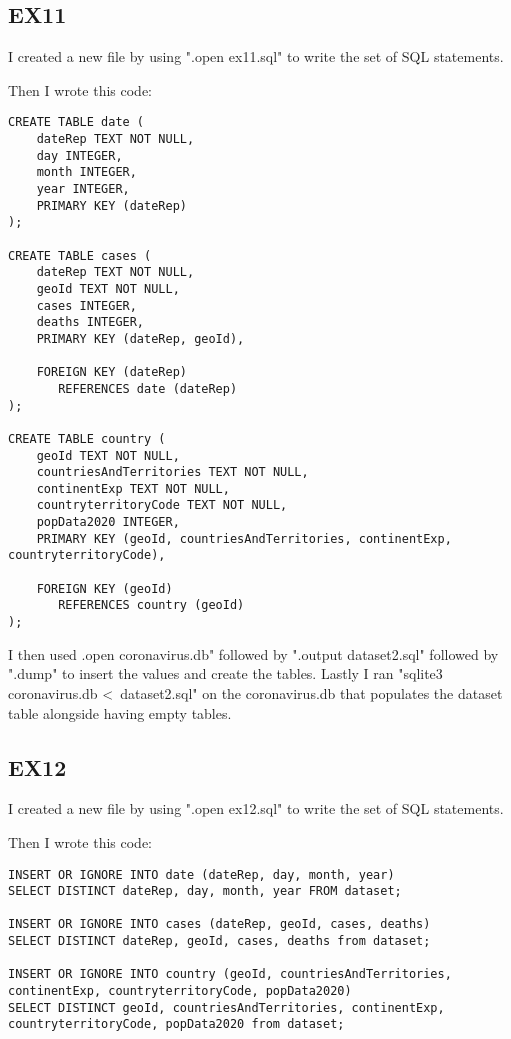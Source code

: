 \documentclass{article}
\begin{document}
\subsection{EX11}

I created a new file by using ".open ex11.sql" to write the set of SQL statements.

Then I wrote this code:

\begin{verbatim}
CREATE TABLE date (
    dateRep TEXT NOT NULL,
    day INTEGER,
    month INTEGER,
    year INTEGER,
    PRIMARY KEY (dateRep)
);

CREATE TABLE cases (
    dateRep TEXT NOT NULL,
    geoId TEXT NOT NULL,
    cases INTEGER,
    deaths INTEGER,
    PRIMARY KEY (dateRep, geoId),

    FOREIGN KEY (dateRep)
       REFERENCES date (dateRep)
);

CREATE TABLE country (
    geoId TEXT NOT NULL,
    countriesAndTerritories TEXT NOT NULL,
    continentExp TEXT NOT NULL,
    countryterritoryCode TEXT NOT NULL,
    popData2020 INTEGER,
    PRIMARY KEY (geoId, countriesAndTerritories, continentExp, countryterritoryCode),

    FOREIGN KEY (geoId)
       REFERENCES country (geoId)
);
\end{verbatim}

I then used .open coronavirus.db" followed by ".output dataset2.sql" followed by ".dump" to insert the values and create the tables. Lastly I ran "sqlite3 coronavirus.db \textless\ dataset2.sql" on the coronavirus.db that populates the dataset table alongside having empty tables.

\subsection{EX12}

I created a new file by using ".open ex12.sql" to write the set of SQL statements.

Then I wrote this code:

\begin{verbatim}
INSERT OR IGNORE INTO date (dateRep, day, month, year)
SELECT DISTINCT dateRep, day, month, year FROM dataset;

INSERT OR IGNORE INTO cases (dateRep, geoId, cases, deaths)
SELECT DISTINCT dateRep, geoId, cases, deaths from dataset;

INSERT OR IGNORE INTO country (geoId, countriesAndTerritories, continentExp, countryterritoryCode, popData2020)
SELECT DISTINCT geoId, countriesAndTerritories, continentExp, countryterritoryCode, popData2020 from dataset;
\end{verbatim}
\end{document}

